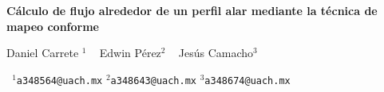\documentclass[portrait]{Hylangtechposter}
\begin{document}
\printheader

\begin{center}
\textbf{\bf\veryHuge\color{Purple} Cálculo de flujo alrededor de un perfil alar mediante la técnica de mapeo conforme \\[0.5cm]}


\huge     Daniel Carrete $^1$  ~
    Edwin Pérez$^2$  ~ 
    Jesús Camacho$^3$~ 
  
\Large    \texttt{ $^1$a348564@uach.mx} \qquad \texttt{$^2$a348643@uach.mx} \qquad \texttt{$^3$a348674@uach.mx} 
 

 \end{center}




  

\vspace{0.3cm}


 \Large
\end{document}
